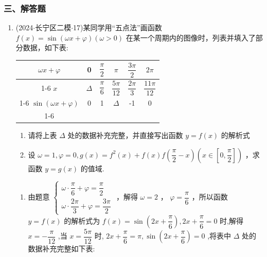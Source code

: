 \subsubsection*{三、解答题}
\begin{enumerate}
    \item (2024$\cdot$长宁区二模$\cdot$17)某同学用“五点法”画函数 $f\left( x\right)  = \sin \left( {{\omega x} + \varphi }\right) \left( {\omega  > 0}\right)$ 在某一个周期内的图像时，列表并填入了部分数据，如下表:
    \begin{center}
    \begin{tabular}{|c|c|c|c|c|c|}
    \hline
    ${\omega x} + \varphi$ & 0 & $\dfrac{\pi }{2}$ & $\pi$ & $\dfrac{3\pi }{2}$ & ${2\pi }$ \\
    \cline{1-6}
    $x$ & $\Delta$ & $\dfrac{\pi }{6}$ & $\dfrac{5\pi }{12}$ & $\dfrac{2\pi }{3}$ & $\dfrac{11\pi }{12}$ \\
    \cline{1-6}
    $\sin \left( {{\omega x} + \varphi }\right)$ & 0 & 1 & $\Delta$ & -1 & 0 \\
    \cline{1-6}
    \hline
    \end{tabular}
    \end{center}
    \begin{enumerate}
        \item 请将上表 $\Delta$ 处的数据补充完整，并直接写出函数 $y = f\left( x\right)$ 的解析式
        \item 设 $\omega  = 1,\varphi  = 0,g\left( x\right)  = {f}^{2}\left( x\right)  + f\left( x\right) f\left( {\dfrac{\pi }{2} - x}\right) \left( {x \in  \left\lbrack  {0,\dfrac{\pi }{2}}\right\rbrack  }\right)$ ，求函数 $y = g\left( x\right)$ 的值域.
    \end{enumerate}
    \begin{jieda}
        \begin{enumerate}
            \item 由题意 $\left\{  \begin{array}{l} \omega  \cdot  \dfrac{\pi }{6} + \varphi  = \dfrac{\pi }{2} \\  \omega  \cdot  \dfrac{2\pi }{3} + \varphi  = \dfrac{3\pi }{2} \end{array}\right.$ ，解得 $\omega  = 2$ ， $\varphi  = \dfrac{\pi }{6}$ ，所以函数 $y = f\left( x\right)$ 的解析式为 $f\left( x\right)  = \sin \left( {{2x} + \dfrac{\pi }{6}}\right) ,{2x} + \dfrac{\pi }{6} = 0$ 时,解得 $x =  - \dfrac{\pi }{12}$ ,当 $x = \dfrac{5\pi }{12}$ 时, ${2x} + \dfrac{\pi }{6} = \pi ,\sin \left( {{2x} + \dfrac{\pi }{6}}\right)  = 0$ ,将表中 $\Delta$ 处的数据补充完整如下表:


\end{enumerate}
\end{jieda}
\end{enumerate}
